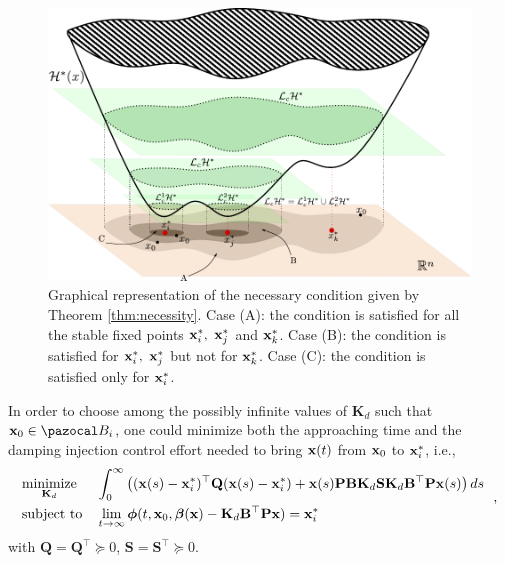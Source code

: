 \begin{figure}
    \centering
    \includegraphics[scale = 0.5]{Drawings/draw3.pdf}
    \caption[Graphical representation of the necessary condition given by Theorem \ref{thm:necessity}]{Graphical representation of the necessary condition given by Theorem \ref{thm:necessity}. Case (A): the condition is satisfied for all the stable fixed points $\mathbf{x}_i^*,~\mathbf{x}_j^*$ and $\mathbf{x}_k^*$. Case (B): the condition is satisfied for $\mathbf{x}_i^*,~\mathbf{x}_j^*$ but not for $\mathbf{x}_k^*$. Case (C): the condition is satisfied only for $\mathbf{x}_i^*$.}
    \label{fig:nec}
\end{figure}
%

In order to choose among the possibly infinite values of $\mathbf{K}_d$ such that  $\xb_0\in\B_i$, one could minimize both the approaching time and the damping injection control effort needed to bring $\mathbf{x}(t)$ from $\mathbf{x}_0$ to $\mathbf{x}_i^*$, i.e.,
%
\begin{equation}
    \begin{aligned}
        & \underset{\mathbf{K}_d}{\text{minimize}}
        & & \int_0^\infty\left( (\mathbf{x}(s)-\mathbf{x}_i^*)^\top\mathbf{Q}(\mathbf{x}(s)-\mathbf{x}_i^*) + \mathbf{x}(s)\mathbf{P}\mathbf{B}\mathbf{K}_d\mathbf{S}\mathbf{K}_d\mathbf{B}^\top \mathbf{P}\mathbf{x}(s)\right)ds \\
        & \text{subject to}
        & &\lim\limits_{t\rightarrow\infty}\bm\phi(t,\mathbf{x}_0,\bm\beta(\mathbf{x})-\mathbf{K}_d\mathbf{B}^\top \mathbf{P}\mathbf{x})=\mathbf{x}^*_i
    \end{aligned}~~,
\end{equation}
%
with $\mathbf{Q}=\mathbf{Q}^\top\succeq 0$, $\mathbf{S}=\mathbf{S}^\top\succeq 0$.
%
\clearpage
%
